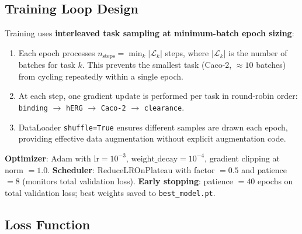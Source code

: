 \documentclass[a4paper,11pt,twoside]{report}
\begin{document}
\subsection{Training Loop Design}

Training uses \textbf{interleaved task sampling at minimum-batch epoch sizing}:
\begin{enumerate}
  \item Each epoch processes $n_{\text{steps}} = \min_{k}|\mathcal{L}_k|$ steps, where $|\mathcal{L}_k|$ is the number of batches for task $k$. This prevents the smallest task (Caco-2, $\approx 10$ batches) from cycling repeatedly within a single epoch.
  \item At each step, one gradient update is performed per task in round-robin order: \texttt{binding} $\to$ \texttt{hERG} $\to$ \texttt{Caco-2} $\to$ \texttt{clearance}.
  \item DataLoader \texttt{shuffle=True} ensures different samples are drawn each epoch, providing effective data augmentation without explicit augmentation code.
\end{enumerate}

\noindent \textbf{Optimizer}: Adam with $\text{lr}=10^{-3}$, $\text{weight\_decay}=10^{-4}$, gradient clipping at norm $= 1.0$.
\noindent \textbf{Scheduler}: ReduceLROnPlateau with factor $= 0.5$ and patience $= 8$ (monitors total validation loss).
\noindent \textbf{Early stopping}: patience $= 40$ epochs on total validation loss; best weights saved to \texttt{best\_model.pt}.

\subsection{Loss Function}
\end{document}
